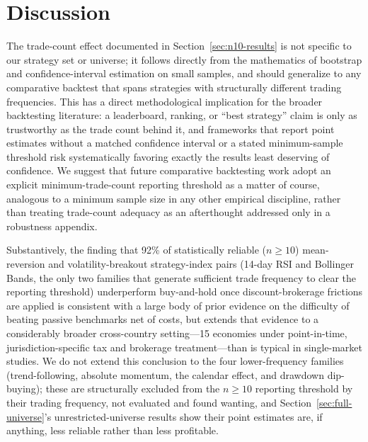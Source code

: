 \documentclass[11pt]{article}
\begin{document}
\section{Discussion}
\label{sec:discussion}

The trade-count effect documented in Section~\ref{sec:n10-results} is not specific to our strategy set or universe; it follows directly from the mathematics of bootstrap and confidence-interval estimation on small samples, and should generalize to any comparative backtest that spans strategies with structurally different trading frequencies. This has a direct methodological implication for the broader backtesting literature: a leaderboard, ranking, or ``best strategy'' claim is only as trustworthy as the trade count behind it, and frameworks that report point estimates without a matched confidence interval or a stated minimum-sample threshold risk systematically favoring exactly the results least deserving of confidence. We suggest that future comparative backtesting work adopt an explicit minimum-trade-count reporting threshold as a matter of course, analogous to a minimum sample size in any other empirical discipline, rather than treating trade-count adequacy as an afterthought addressed only in a robustness appendix.

Substantively, the finding that 92\% of statistically reliable ($n \geq 10$) mean-reversion and volatility-breakout strategy-index pairs (14-day RSI and Bollinger Bands, the only two families that generate sufficient trade frequency to clear the reporting threshold) underperform buy-and-hold once discount-brokerage frictions are applied is consistent with a large body of prior evidence on the difficulty of beating passive benchmarks net of costs, but extends that evidence to a considerably broader cross-country setting---15 economies under point-in-time, jurisdiction-specific tax and brokerage treatment---than is typical in single-market studies. We do not extend this conclusion to the four lower-frequency families (trend-following, absolute momentum, the calendar effect, and drawdown dip-buying); these are structurally excluded from the $n \geq 10$ reporting threshold by their trading frequency, not evaluated and found wanting, and Section~\ref{sec:full-universe}'s unrestricted-universe results show their point estimates are, if anything, less reliable rather than less profitable.
\end{document}
